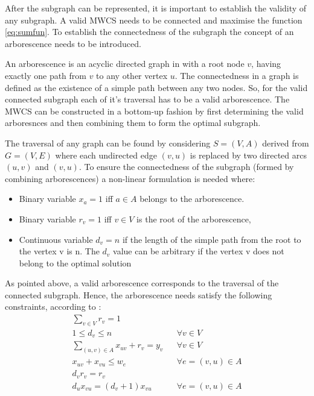 \documentclass[msthesis.tex]{subfiles}
\begin{document}
After the subgraph can be represented, it is important to establish the validity of any subgraph. A valid MWCS needs to be connected and maximise the function \autoref{eq:sumfun}. To establish the connectedness of the subgraph the concept of an arborescence needs to be introduced.

An arborescence is an acyclic directed graph in with a root node $v$, having exactly one path from $v$ to any other vertex $u$. The connectedness in a graph is defined as the existence of a simple path between any two nodes. So, for the valid connected subgraph each of it's traversal has to be a valid arborescence. The MWCS can be constructed in a bottom-up fashion by first determining the valid arboresnces and then combining them to form the optimal subgraph.

The traversal of any graph can be found by considering $S = (V,A)$ derived from $G=(V,E)$  where each undirected edge $(v,u)$ is replaced by two directed arcs $(u,v)$ and $(v,u)$. To ensure the connectedness of the subgraph (formed by combining arborescences) a non-linear formulation is needed where:
\begin{itemize}
     \setlength\itemsep{0.5em}
    \item Binary variable $x_a = 1$ iff $a \in A$ belongs to the arborescence.
    \item Binary variable $r_v = 1$ iff $v \in V$ is the root of the arborescence,
    \item Continuous variable $d_v = n$ if the length of the simple path from the root to the vertex v is n. The $d_v$ value can be arbitrary if the vertex v does not belong to the optimal solution
\end{itemize}
As pointed above, a valid arborescence corresponds to the traversal of the connected subgraph. Hence, the arborescence needs satisfy the following constraints, according to \cite{haouari2013enhanced}:
\begin{align}
    \label{eq:rv}
    \sum_{v \in V} r_v = 1\\
    \label{eq:dv}
    1 \leq d_v \leq n && \forall v \in V \\
    \label{eq:uvrv}
    \sum_{(u,v) \in A} x_{uv} + r_v = y_v && \forall v \in V\\
    \label{eq:fronba}
    x_{uv} + x_{vu} \leq w_e && \forall e =(v,u) \in A\\
    \label{eq:dvrv}
    d_v r_v = r_v\\
    \label{eq:dudv}
    d_u x_{vu} = (d_v + 1) x_{vu} && \forall e=(v, u) \in A
\end{align}
\end{document}
